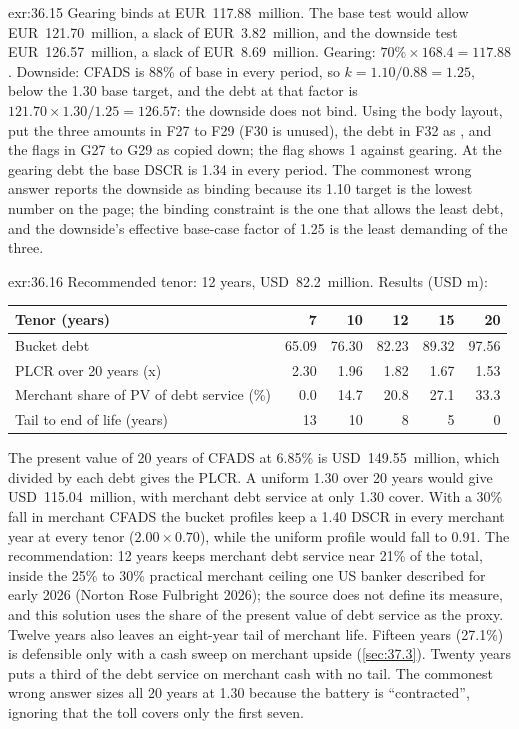 \begin{solution}{exr:36.15}
Gearing binds at EUR~117.88~million. The base test would allow EUR~121.70~million, a slack of EUR~3.82~million, and the downside test EUR~126.57~million, a slack of EUR~8.69~million. Gearing: $70\% \times 168.4 = 117.88$. Downside: CFADS is 88\% of base in every period, so $k = 1.10/0.88 = 1.25$, below the 1.30\x{} base target, and the debt at that factor is $121.70 \times 1.30/1.25 = 126.57$: the downside does not bind. Using the body layout, put the three amounts in F27 to F29 (F30 is unused), the debt in F32 as , and the flags in G27 to G29 as  copied down; the flag shows 1 against gearing. At the gearing debt the base DSCR is 1.34\x{} in every period. The commonest wrong answer reports the downside as binding because its 1.10\x{} target is the lowest number on the page; the binding constraint is the one that allows the least debt, and the downside's effective base-case factor of 1.25 is the least demanding of the three.
\end{solution}

\begin{solution}{exr:36.16}
Recommended tenor: 12 years, USD~82.2~million. Results (USD m):
\begin{center}\small
\begin{tabularx}{\linewidth}{@{}L rrrrr@{}}
\toprule
Tenor (years) & 7 & 10 & 12 & 15 & 20\\
\midrule
Bucket debt & 65.09 & 76.30 & 82.23 & 89.32 & 97.56\\
PLCR over 20 years (x) & 2.30 & 1.96 & 1.82 & 1.67 & 1.53\\
Merchant share of PV of debt service (\%) & 0.0 & 14.7 & 20.8 & 27.1 & 33.3\\
Tail to end of life (years) & 13 & 10 & 8 & 5 & 0\\
\bottomrule
\end{tabularx}
\end{center}
The present value of 20 years of CFADS at 6.85\% is USD~149.55~million, which divided by each debt gives the PLCR. A uniform 1.30\x{} over 20 years would give USD~115.04~million, with merchant debt service at only 1.30\x{} cover. With a 30\% fall in merchant CFADS the bucket profiles keep a 1.40\x{} DSCR in every merchant year at every tenor ($2.00 \times 0.70$), while the uniform profile would fall to 0.91\x. The recommendation: 12 years keeps merchant debt service near 21\% of the total, inside the 25\% to 30\% practical merchant ceiling one US banker described for early 2026 (Norton Rose Fulbright 2026); the source does not define its measure, and this solution uses the share of the present value of debt service as the proxy. Twelve years also leaves an eight-year tail of merchant life. Fifteen years (27.1\%) is defensible only with a cash sweep on merchant upside (\cref{sec:37.3}). Twenty years puts a third of the debt service on merchant cash with no tail. The commonest wrong answer sizes all 20 years at 1.30\x{} because the battery is ``contracted'', ignoring that the toll covers only the first seven.
\end{solution}

